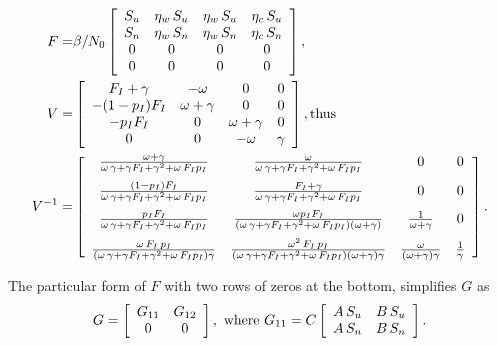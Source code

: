 \documentclass[12pt]{article}
\theoremstyle{definition} %
\begin{document}
\begin{align}
\label{FV}
F =& \beta/N_0 \left[ \begin {array}{cccc} 
S_u&\eta_w\,S_u&\eta_w\,S_u&\eta_c\,S_u\\
S_n&\eta_w\,S_n&\eta_w\,S_n&\eta_c\,S_n\\ 
0&0&0&0\\
0&0&0&0
 \end {array} \right], \\
  V =&
 \left[ \begin {array}{cccc}  
F_I+\gamma&-\omega&0&0\\
-(1-p_I)F_I&\omega+\gamma&0&0\\
-p_I F_I&0&\omega+\gamma&0\\
0&0&-\omega&\gamma
\end {array} \right], \text{thus}\\
V^{-1} =&
\left[ \begin {array}{cccc}
\frac {\omega+\gamma}{\omega\,\gamma+\gamma F_I+\gamma^2+\omega\, F_I p_I}&\frac {\omega}{\omega\,\gamma+\gamma F_I+\gamma^2+\omega\, F_I p_I}&0&0\\
\noalign{\medskip}
\frac{(1-p_I) F_I}{\omega\,\gamma+\gamma F_I+\gamma^2+\omega\, F_I p_I}&
\frac{F_I+\gamma}{\omega\,\gamma+\gamma F_I+\gamma^2+\omega\, F_I p_I}&0&0\\
\noalign{\medskip}
\frac{p_I F_I}{\omega\,\gamma+\gamma F_I+\gamma^2+\omega\, F_I p_I}&
\frac{\omega p_I F_I}{(\omega\,\gamma+\gamma F_I+\gamma^2+\omega\, F_I p_I)(\omega+\gamma)}& \frac{1}{\omega+\gamma}&0 \\
\noalign{\medskip}
\frac{\omega\,F_I\,p_I}{(\omega\,\gamma+\gamma F_I+\gamma^2+\omega\, F_I p_I) \gamma}& 
\frac{\omega^2\,F_I\,p_I}{(\omega\,\gamma+\gamma F_I+\gamma^2+\omega\, F_I p_I)(\omega+\gamma) \gamma}&
\frac{\omega}{(\omega+\gamma) \gamma}&
\frac{1}{\gamma}
\end {array} \right].
\end{align}

The particular form of $F$ with two rows of zeros at the bottom, simplifies $G$ as 
\begin{equation}
G = \left[ \begin {array}{cc}
G_{11}&G_{12}\\
0&0
\end {array} \right], \text{ where } \\
G_{11} =C
\left[\begin {array}{cc}
A\,S_u & B\,S_u\\
A\,S_n & B\,S_n
\end {array}\right].
\end{equation}
\end{document}
